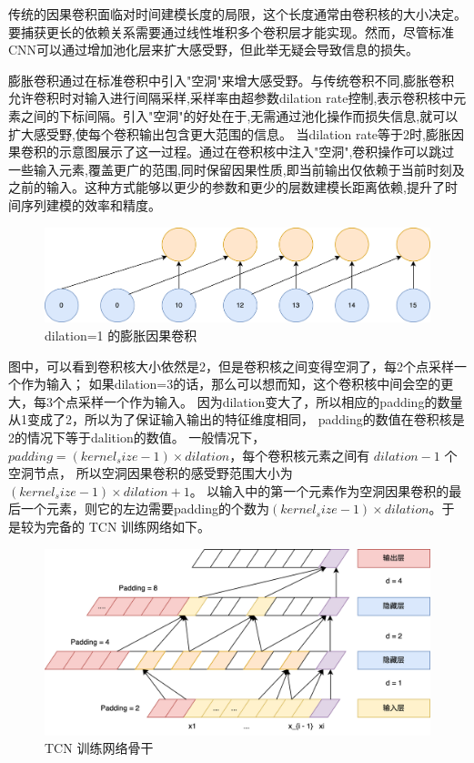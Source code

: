 传统的因果卷积面临对时间建模长度的局限，这个长度通常由卷积核的大小决定。要捕获更长的依赖关系需要通过线性堆积多个卷积层才能实现。然而，尽管标准CNN可以通过增加池化层来扩大感受野，但此举无疑会导致信息的损失。

膨胀卷积通过在标准卷积中引入"空洞"来增大感受野。与传统卷积不同,膨胀卷积允许卷积时对输入进行间隔采样,采样率由超参数dilation rate控制,表示卷积核中元素之间的下标间隔。引入"空洞"的好处在于,无需通过池化操作而损失信息,就可以扩大感受野,使每个卷积输出包含更大范围的信息。
当dilation rate等于2时,膨胀因果卷积的示意图展示了这一过程。通过在卷积核中注入"空洞",卷积操作可以跳过一些输入元素,覆盖更广的范围,同时保留因果性质,即当前输出仅依赖于当前时刻及之前的输入。这种方式能够以更少的参数和更少的层数建模长距离依赖,提升了时间序列建模的效率和精度。

\begin{figure}[htbp]
	\centering
	\includegraphics[width=\textwidth]{figures/dilation_convolution.png}
	\caption{dilation=1 的膨胀因果卷积}
\end{figure}

图中，可以看到卷积核大小依然是2，但是卷积核之间变得空洞了，每2个点采样一个作为输入；
如果dilation=3的话，那么可以想而知，这个卷积核中间会空的更大，每3个点采样一个作为输入。
因为dilation变大了，所以相应的padding的数量从1变成了2，所以为了保证输入输出的特征维度相同，
padding的数值在卷积核是2的情况下等于dalition的数值。
一般情况下，$padding=(kernel_size-1)\times dilation$，每个卷积核元素之间有 $dilation - 1$ 个空洞节点，
所以空洞因果卷积的感受野范围大小为 $(kernel_size-1) \times dilation + 1$。
以输入中的第一个元素作为空洞因果卷积的最后一个元素，则它的左边需要padding的个数为$(kernel_size-1) \times dilation$。于是较为完备的 TCN 训练网络如下。

\begin{figure}[htbp]
	\centering
	\includegraphics[width=\textwidth]{figures/tcn_1.png}
	\caption{TCN 训练网络骨干}
\end{figure}

